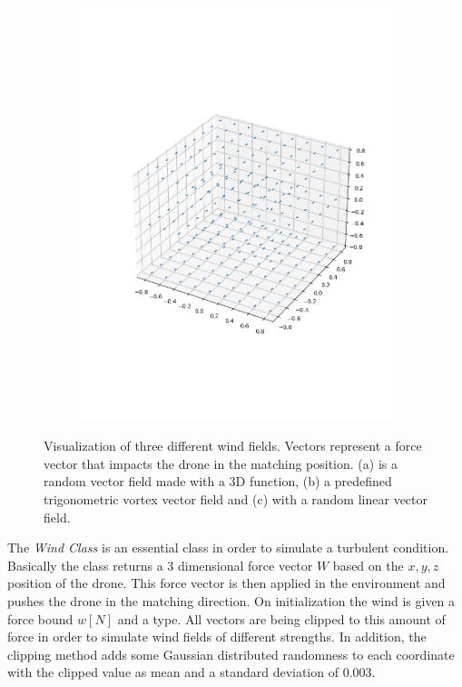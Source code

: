 \begin{figure}
\begin{subfigure}{0.32\linewidth}
		\includegraphics[width=\linewidth]{figures/wind3.png}
		\caption{}
		\label{fig:wind0}
	\end{subfigure}
	\caption{Visualization of three different wind fields. Vectors represent a force vector that impacts the drone in the matching position. (a)  is a random vector field made with a 3D function, (b) a predefined trigonometric vortex vector field and (c) with a random linear vector field.}
\end{figure}
The \emph{Wind Class} is an essential class in order to simulate a turbulent condition. Basically the class returns a 3 dimensional force vector $W$ based on the $x,y,z$ position of the drone. This force vector is then applied in the environment and pushes the drone in the matching direction. On initialization the wind is given a force bound $w [N]$ and a type. All vectors are being clipped to this amount of force in order to simulate wind fields of different strengths. In addition, the clipping method adds some Gaussian distributed randomness to each coordinate with the clipped value as mean and a standard deviation of $0.003$. \\

